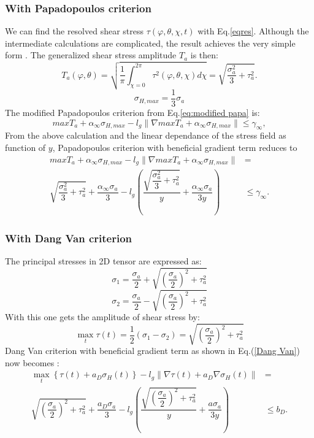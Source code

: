 \subsubsection{With Papadopoulos criterion}
We can find the resolved shear stress $\tau(\varphi,\theta,\chi ,t)$ with Eq.\eqref{eqres}. Although the intermediate calculations are complicated, the result achieves the very simple form \cite{Papadopoulos1997219}. The generalized shear stress amplitude $T_a$ is then:
$$T_a(\varphi,\theta)=\sqrt{\dfrac{1}{\pi}\int_{\chi=0}^{2\pi} \tau^2(\varphi,\theta,\chi)d\chi}
=\sqrt{\dfrac{\sigma_a^2}{3}+\tau_a^2}.
$$
$$\sigma_{H,max}=\dfrac{1}{3}\sigma_a$$
The modified Papadopoulos criterion from Eq.\eqref{eq:modified papa} is:
$$maxT_a+\alpha_\infty\sigma_{H,max}-l_g\parallel\nabla{maxT_a}+\alpha_\infty\sigma_{H,max}\parallel\leqslant \gamma_\infty,$$
From the above calculation and the linear dependance of the stress field as function of $y$, 
Papadopoulos criterion with beneficial gradient term reduces to 
\begin{equation}
	\begin{split}
		maxT_a+\alpha_\infty\sigma_{H,max}-l_g\parallel\nabla{maxT_a}+\alpha_\infty\sigma_{H,max}\parallel&=\\\sqrt{\dfrac{\sigma_a^2}{3}+\tau_a^2}+\dfrac{\alpha_\infty\sigma_a}{3}-l_g\left( \dfrac{\sqrt{\dfrac{\sigma_a^2}{3}+\tau_a^2}}{y}+\dfrac{\alpha_\infty\sigma_a}{3y}\right) &\leqslant \gamma_\infty.
	\end{split}
	\label{modified Papadopoulos}
\end{equation}

\subsubsection{With Dang Van criterion}
The principal stresses in 2D tensor are expressed as:
$$\sigma_1=\dfrac{\sigma_a}{2}+\sqrt{\left( \dfrac{\sigma_a}{2}\right)^2+\tau_a^2 }$$
$$\sigma_2=\dfrac{\sigma_a}{2}-\sqrt{\left( \dfrac{\sigma_a}{2}\right)^2+\tau_a^2 }$$
With this one gets the amplitude of shear stress by:
$$\max\limits_{t}\tau(t)=\dfrac{1}{2}(\sigma_1-\sigma_2)=\sqrt{\left( \dfrac{\sigma_a}{2}\right)^2+\tau_a^2 }$$
Dang Van criterion with beneficial gradient term as shown in Eq.(\ref{Dang Van}) now becomes :
\begin{equation}
	\begin{split}
		\max\limits_{t}\left\{\tau{(t)}+a_D\sigma_H(t)\right\}-l_g\parallel{\nabla\tau{(t)}}+a_D\nabla\sigma_H(t)\parallel&=
		\\\sqrt{\left(\dfrac{\sigma_a}{2}\right)^2+\tau_a^2}+\dfrac{a_D\sigma_a}{3}-l_g\left( \dfrac{\sqrt{\left(\dfrac{\sigma_a}{2}\right)^2+\tau_a^2}}{y}+\dfrac{a\sigma_a}{3y}\right) &\leqslant b_D.
	\end{split}
	\label{Dang Van}
\end{equation}

